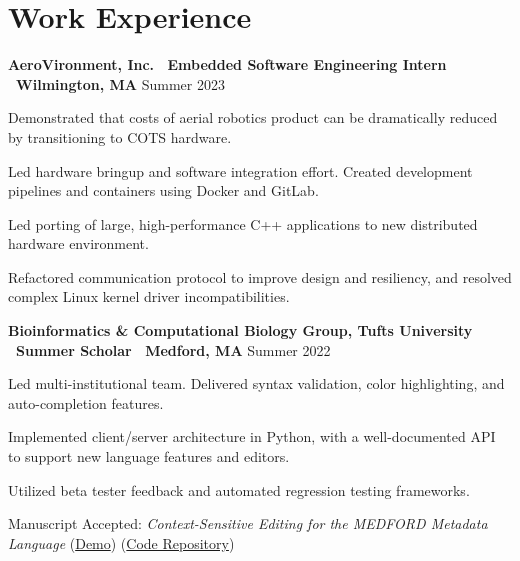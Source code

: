 \documentclass[letter,10pt]{article}
\newenvironment{mylist}[1][]
    {\itemize[nosep, wide=0pt, leftmargin=*, after=\strut]}
    {\enditemize}
\begin{document}

\section{Work Experience}
\begin{minipage}[t]{\linewidth}
    \textbf{AeroVironment, Inc. \textbar \ Embedded Software Engineering Intern \textbar \ Wilmington, MA} \hfill Summer 2023 
    \begin{mylist}
        \item Demonstrated that costs of aerial robotics product can be dramatically reduced by transitioning to COTS hardware. 
        \item Led hardware bringup and software integration effort. Created development pipelines and containers using Docker and GitLab. 
        \item Led porting of large, high-performance C++ applications to new distributed hardware environment. 
        \item Refactored communication protocol to improve design and resiliency, and resolved complex Linux kernel driver incompatibilities.
    \end{mylist}
\end{minipage}


\begin{minipage}[t]{\linewidth}
    \textbf{Bioinformatics \& Computational Biology Group, Tufts University \textbar \ Summer Scholar \textbar \ Medford, MA} \hfill Summer 2022
    \begin{mylist}
        \item Led multi-institutional team. Delivered syntax validation, color highlighting, and auto-completion features.
        \item Implemented client/server architecture in Python, with a well-documented API to support new language features and editors. 
        \item Utilized beta tester feedback and automated regression testing frameworks.
        \item Manuscript Accepted: \textit{Context-Sensitive Editing for the MEDFORD Metadata Language} (\href{https://youtu.be/TFLdXxnaBlU}{Demo}) (\href{https://github.com/liam-strand/medford-language-server}{Code Repository})
    \end{mylist}
\end{minipage}
\end{document}

